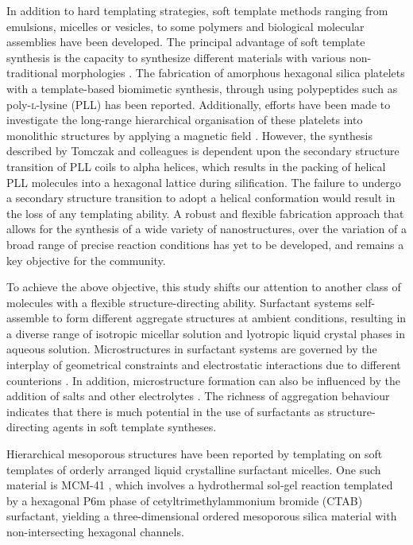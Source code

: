 \documentclass[a4paper,12pt,twocolumn]{article}
\begin{document}
In addition to hard templating strategies, soft template methods ranging from emulsions, micelles or vesicles, to some polymers and biological molecular assemblies have been developed. The principal advantage of soft template synthesis is the capacity to synthesize different materials with various non-traditional morphologies \cite{wan2007}. The fabrication of amorphous hexagonal silica platelets with a template-based biomimetic synthesis, through using polypeptides such as poly-\textsc{l}-lysine (PLL) \cite{tomczak2005} has been reported. Additionally, efforts have been made to investigate the long-range hierarchical organisation of these platelets into monolithic structures by applying a magnetic field \cite{bellomo2006}. However, the synthesis described by Tomczak and colleagues is dependent upon the secondary structure transition of PLL coils to alpha helices, which results in the packing of helical PLL molecules into a hexagonal lattice during silification. The failure to undergo a secondary structure transition to adopt a helical conformation would result in the loss of any templating ability. A robust and flexible fabrication approach that allows for the synthesis of a wide variety of nanostructures, over the variation of a broad range of precise reaction conditions has yet to be developed, and remains a key objective for the community.

To achieve the above objective, this study shifts our attention to another class of molecules with a flexible structure-directing ability. Surfactant systems self-assemble to form different aggregate structures at ambient conditions, resulting in a diverse range of isotropic micellar solution and lyotropic liquid crystal phases in aqueous solution. Microstructures in surfactant systems are governed by the interplay of geometrical constraints \cite{israelachvili1976} and electrostatic interactions due to different counterions \cite{kang1993}. In addition, microstructure formation can also be influenced by the addition of salts and other electrolytes \cite{thalberg1991}. The richness of aggregation behaviour indicates that there is much potential in the use of surfactants as structure-directing agents in soft template syntheses. 

Hierarchical mesoporous structures have been reported by templating on soft templates of orderly arranged liquid crystalline surfactant micelles. One such material is MCM-41 \cite{kresge1992}, which involves a hydrothermal sol-gel reaction templated by a hexagonal P6m phase of cetyltrimethylammonium bromide (CTAB) surfactant, yielding a three-dimensional ordered mesoporous silica material with non-intersecting hexagonal channels.
\end{document}
